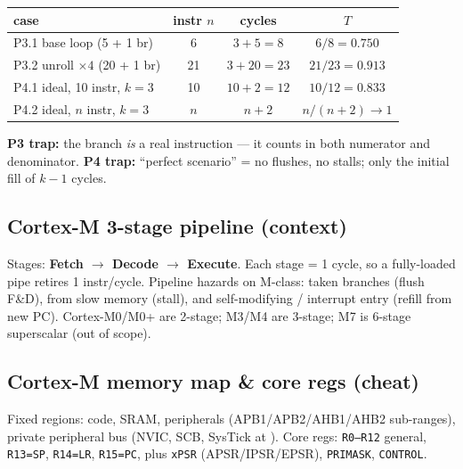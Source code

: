 \begin{center}\scriptsize
\begin{tabular}{@{}lccc@{}}
\toprule
case & instr $n$ & cycles & $T$ \\
\midrule
P3.1 base loop (5 + 1 br) & 6  & $3{+}5{=}8$  & $6/8=0.750$ \\
P3.2 unroll $\times 4$ (20 + 1 br) & 21 & $3{+}20{=}23$ & $21/23=0.913$ \\
P4.1 ideal, 10 instr, $k{=}3$ & 10 & $10{+}2{=}12$ & $10/12=0.833$ \\
P4.2 ideal, $n$ instr, $k{=}3$ & $n$ & $n{+}2$ & $n/(n{+}2)\to 1$ \\
\bottomrule
\end{tabular}
\end{center}
\begin{hwp}
\textbf{P3 trap:} the branch \emph{is} a real instruction --- it counts in both numerator and denominator. \textbf{P4 trap:} ``perfect scenario'' = no flushes, no stalls; only the initial fill of $k{-}1$ cycles.
\end{hwp}

\subsection{Cortex-M 3-stage pipeline (context)}
Stages: \textbf{Fetch $\to$ Decode $\to$ Execute}. Each stage = 1 cycle, so a fully-loaded pipe retires 1 instr/cycle. Pipeline hazards on M-class: taken branches (flush F\&D),  from slow memory (stall), and self-modifying / interrupt entry (refill from new PC). Cortex-M0/M0+ are 2-stage; M3/M4 are 3-stage; M7 is 6-stage superscalar (out of scope).

\subsection{Cortex-M memory map \& core regs (cheat)}
Fixed regions:  code,  SRAM,  peripherals (APB1/APB2/AHB1/AHB2 sub-ranges),  private peripheral bus (NVIC, SCB, SysTick at ). Core regs: \texttt{R0--R12} general, \texttt{R13=SP}, \texttt{R14=LR}, \texttt{R15=PC}, plus \texttt{xPSR} (APSR/IPSR/EPSR), \texttt{PRIMASK}, \texttt{CONTROL}.

